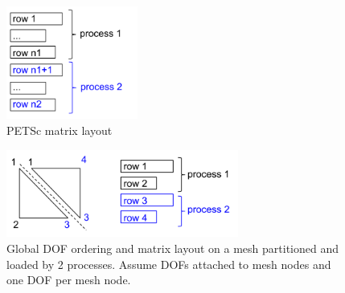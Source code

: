 \documentclass[11pt]{article}  %
\begin{document}
\begin{figure}
\center
\includegraphics[width=1.7in]{fig/petscMatLayout.png}
\caption{\small{PETSc matrix layout}} 
\label{fig:petscMatLayout}
\end{figure}
\begin{figure}
\center
\includegraphics[width=3in]{fig/partitionedMeshSim.png}
\caption{\small{Global DOF ordering and matrix layout on a mesh partitioned and loaded by 2 processes. Assume DOFs attached to mesh nodes and one DOF per mesh node.}} 
\label{fig:2d-mesh-psim}
\end{figure}

\end{document}
